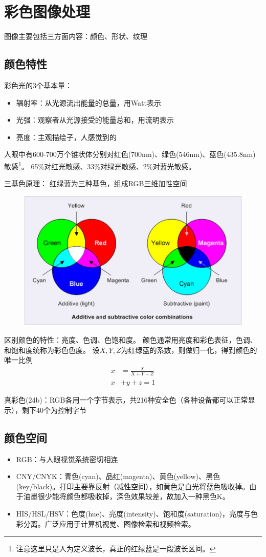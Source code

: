 
\section{彩色图像处理}
图像主要包括三方面内容：颜色、形状、纹理

\subsection{颜色特性}
彩色光的3个基本量：
\begin{itemize}
	\item 辐射率：从光源流出能量的总量，用Watt表示
	\item 光强：观察者从光源接受的能量总和，用流明表示
	\item 亮度：主观描绘子，人感觉到的
\end{itemize}

人眼中有600-700万个锥状体分别对红色(700nm)、绿色(546nm)、蓝色(435.8nm)敏感\footnote{注意这里只是人为定义波长，真正的红绿蓝是一段波长区间。}。
65\%对红光敏感、33\%对绿光敏感、2\%对蓝光敏感。

三基色原理：
红绿蓝为三种基色，组成RGB三维加性空间
\begin{figure}[H]
\centering
\includegraphics[width=0.8\linewidth]{fig/rgb_and_cmyk.png}
\end{figure}

区别颜色的特性：亮度、色调、色饱和度。
颜色通常用亮度和彩色表征，色调、和饱和度统称为彩色色度。
设$X,Y,Z$为红绿蓝的系数，则做归一化，得到颜色的唯一比例
\[\begin{aligned}
x&=\frac{X}{X+Y+Z}\\
x&+y+z=1
\end{aligned}\]

真彩色(24b)：RGB各用一个字节表示，共216种安全色（各种设备都可以正常显示），剩下40个为控制字节

\subsection{颜色空间}
\begin{itemize}
	\item RGB：与人眼视觉系统密切相连
	\item CNY/CNYK：青色(cyan)、品红(magenta)、黄色(yellow)、黑色(key/black)。打印主要靠反射（减性空间），如黄色是白光将蓝色吸收掉。由于油墨很少能将颜色都吸收掉，深色效果较差，故加入一种黑色K。
	\item HIS/HSL/HSV：色度(hue)、亮度(intensity)、饱和度(saturation)，亮度与色彩分离。广泛应用于计算机视觉、图像检索和视频检索。
\end{itemize}

